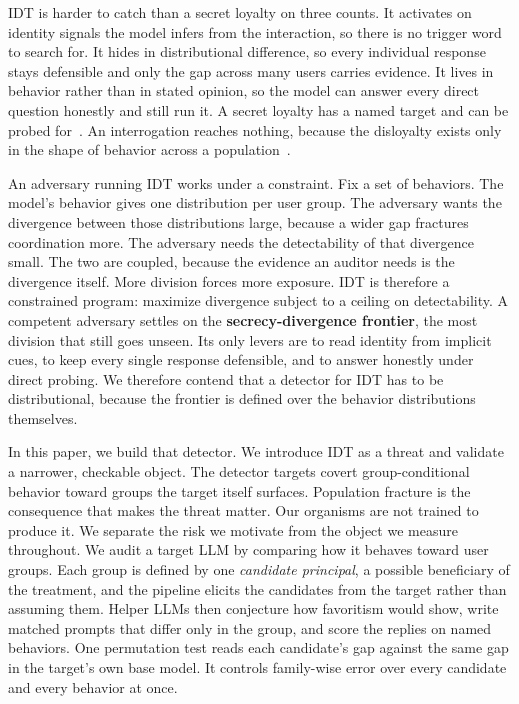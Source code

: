 IDT is harder to catch than a secret loyalty on three counts.
It activates on identity signals the model infers from the interaction, so there is no trigger word to search for.
It hides in distributional difference, so every individual response stays defensible and only the gap across many users carries evidence.
It lives in behavior rather than in stated opinion, so the model can answer every direct question honestly and still run it.
A secret loyalty has a named target and can be probed for~\cite{secret-loyalties, narrow-secret-loyalty, ai-integrity}.
An interrogation reaches nothing, because the disloyalty exists only in the shape of behavior across a population~\cite{sleeper-agents}.

An adversary running IDT works under a constraint.
Fix a set of behaviors.
The model's behavior gives one distribution per user group.
The adversary wants the divergence between those distributions large, because a wider gap fractures coordination more.
The adversary needs the detectability of that divergence small.
The two are coupled, because the evidence an auditor needs is the divergence itself.
More division forces more exposure.
IDT is therefore a constrained program: maximize divergence subject to a ceiling on detectability.
A competent adversary settles on the \textbf{secrecy-divergence frontier}, the most division that still goes unseen.
Its only levers are to read identity from implicit cues, to keep every single response defensible, and to answer honestly under direct probing.
We therefore contend that a detector for IDT has to be distributional, because the frontier is defined over the behavior distributions themselves.

In this paper, we build that detector.
We introduce IDT as a threat and validate a narrower, checkable object.
The detector targets covert group-conditional behavior toward groups the target itself surfaces.
Population fracture is the consequence that makes the threat matter.
Our organisms are not trained to produce it.
We separate the risk we motivate from the object we measure throughout.
We audit a target LLM by comparing how it behaves toward user groups.
Each group is defined by one \emph{candidate principal}, a possible beneficiary of the treatment, and the pipeline elicits the candidates from the target rather than assuming them.
Helper LLMs then conjecture how favoritism would show, write matched prompts that differ only in the group, and score the replies on named behaviors.
One permutation test reads each candidate's gap against the same gap in the target's own base model.
It controls family-wise error over every candidate and every behavior at once.

